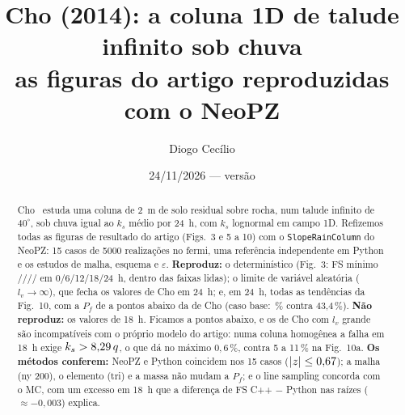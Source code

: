 \documentclass[11pt,a4paper]{article}
\title{Cho (2014): a coluna 1D de talude infinito sob chuva\\ as figuras do artigo reproduzidas com o NeoPZ}
\author{Diogo Cecílio}
\date{24/11/2026 --- versão \versao}
\begin{document}
\maketitle
\begin{abstract}
Cho~\cite{cho2014} estuda uma coluna de 2~m de solo residual sobre rocha, num talude infinito de $40^\circ$, sob chuva
igual ao $k_s$ médio por 24~h, com $k_s$ lognormal em campo 1D. Refizemos todas as figuras de resultado do artigo (Figs.~3 e
5 a 10) com o \texttt{SlopeRainColumn} do NeoPZ: 15 casos de 5000 realizações no fermi, uma referência independente em
Python e os estudos de malha, esquema e $\varepsilon$. \textbf{Reproduz:} o determinístico (Fig.~3: FS mínimo
\fsZero/\fsSeis/\fsDoze/\fsDezoito/\fsVquatro{} em 0/6/12/18/24~h, dentro das faixas lidas); o limite de variável
aleatória ($l_v \to \infty$), que fecha os valores de Cho em 24~h; e, em 24~h, todas as tendências da Fig.~10, com a
$P_f$ de \difVqMin{} a \difVqMax{} pontos abaixo da de Cho (caso base: \pfBaseVq\,\% contra 43,4\,\%).
\textbf{Não reproduz:} os valores de 18~h. Ficamos \difDzMin{} a \difDzMax{} pontos abaixo, e os de Cho com $l_v$ grande
são incompatíveis com o próprio modelo do artigo: numa coluna homogênea a falha em 18~h exige $k_s > 8{,}29\,q$, o
que dá no máximo $0{,}6\,\%$, contra 5 a 11\,\% na Fig.~10a. \textbf{Os métodos conferem:} NeoPZ e Python coincidem nos 15
casos ($|z| \le 0{,}67$); a malha (ny 200), o elemento (tri) e a massa não mudam a $P_f$; e o line sampling concorda
com o MC, com um excesso em 18~h que a diferença de FS C++ $-$ Python nas raízes ($\approx -0{,}003$) explica.
\end{abstract}
\tableofcontents
\end{document}
